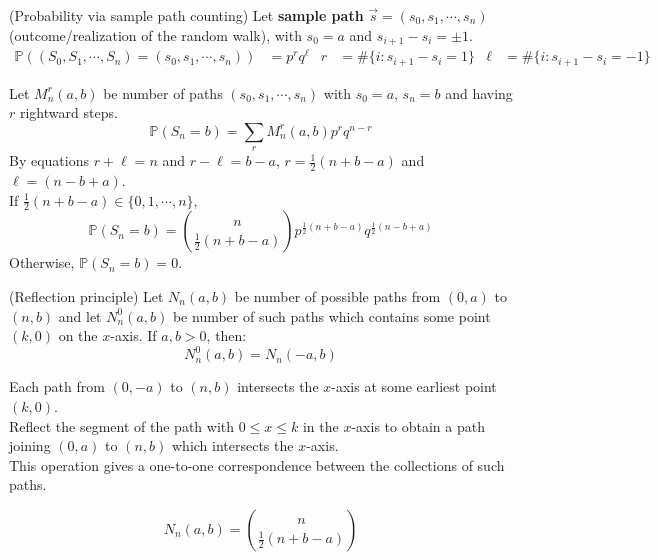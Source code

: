 \documentclass{huhtakm-template-book}
\newcommand{\prob}{\mathbb{P}}
\begin{document}
\begin{eg}(Probability via sample path counting)
	Let \textbf{sample path} $\vec{s}=(s_{0},s_{1},\cdots,s_{n})$ (outcome/realization of the random walk), with $s_{0}=a$ and $s_{i+1}-s_{i}=\pm 1$.
	\begin{align*}
		\prob((S_{0},S_{1},\cdots,S_{n})=(s_{0},s_{1},\cdots,s_{n}))&=p^{r}q^{\ell} & r&=\#\{i:s_{i+1}-s_{i}=1\} & \ell&=\#\{i:s_{i+1}-s_{i}=-1\}
	\end{align*}
\end{eg}
\begin{eg}
	Let $M_{n}^{r}(a,b)$ be number of paths $(s_{0},s_{1},\cdots,s_{n})$ with $s_{0}=a$, $s_{n}=b$ and having $r$ rightward steps.
	\begin{equation*}
		\prob(S_{n}=b)=\sum_{r} M_{n}^{r}(a,b)p^{r}q^{n-r}
	\end{equation*}
	By equations $r+\ell=n$ and $r-\ell=b-a$, $r=\frac{1}{2}(n+b-a)$ and $\ell=(n-b+a)$.\\
	If $\frac{1}{2}(n+b-a)\in\{0,1,\cdots,n\}$,
	\begin{equation*}
		\prob(S_{n}=b)=\binom{n}{\frac{1}{2}(n+b-a)}p^{\frac{1}{2}(n+b-a)}q^{\frac{1}{2}(n-b+a)}
	\end{equation*}
	Otherwise, $\prob(S_{n}=b)=0$.
\end{eg}
\begin{thm}(Reflection principle)
	Let $N_{n}(a,b)$ be number of possible paths from $(0,a)$ to $(n,b)$ and let $N_{n}^{0}(a,b)$ be number of such paths which contains some point $(k,0)$ on the $x$-axis. If $a,b>0$, then:
	\begin{equation*}
		N_{n}^{0}(a,b)=N_{n}(-a,b)
	\end{equation*}
\end{thm}
\begin{proofing}
	Each path from $(0,-a)$ to $(n,b)$ intersects the $x$-axis at some earliest point $(k,0)$.\\
	Reflect the segment of the path with $0\leq x\leq k$ in the $x$-axis to obtain a path joining $(0,a)$ to $(n,b)$ which intersects the $x$-axis.\\
	This operation gives a one-to-one correspondence between the collections of such paths.
\end{proofing}
\begin{lem}
	\label{Number of paths calculation}
	\begin{equation*}
		N_{n}(a,b)=\binom{n}{\frac{1}{2}(n+b-a)}
	\end{equation*}
\end{lem}
\end{document}
